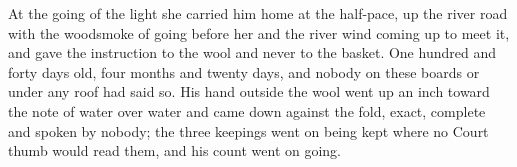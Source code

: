 At the going of the light she carried him home at the half-pace, up the river road with the woodsmoke of  going before her and the river wind coming up to meet it, and gave the instruction to the wool and never to the basket. One hundred and forty days old, four months and twenty days, and nobody on these boards or under any roof had said so. His hand outside the wool went up an inch toward the note of water over water and came down against the fold, exact, complete and spoken by nobody; the three keepings went on being kept where no Court thumb would read them, and his count went on going.
